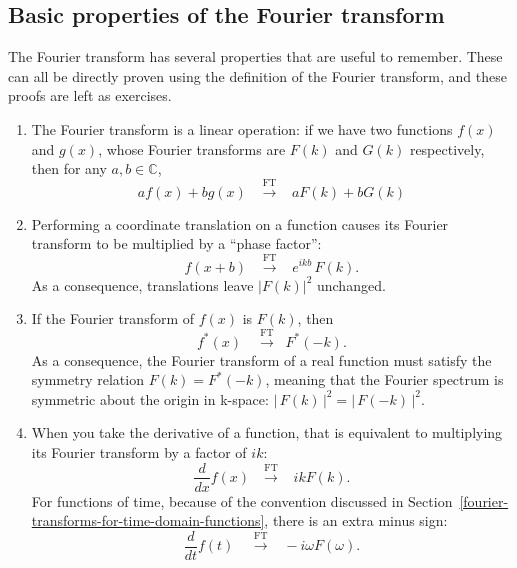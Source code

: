\documentclass[10pt,a4paper]{article}
\begin{document}
\subsection{Basic properties of the Fourier transform}
\label{basic-properties-of-the-fourier-transform}

The Fourier transform has several properties that are useful to
remember. These can all be directly proven using the definition of the
Fourier transform, and these proofs are left as exercises.

\begin{enumerate}
\item 
The Fourier transform is a linear operation: if we have two functions
$f(x)$ and $g(x)$, whose Fourier transforms are $F(k)$ and
$G(k)$ respectively, then for any $a, b \in \mathbb{C}$,
\begin{equation}
  a f(x) + b g(x) \;\;\;  \overset{\mathrm{FT}}{\longrightarrow} \;\;\; a F(k) + b G(k)
\end{equation}

\item
  Performing a coordinate translation on a function causes its Fourier
transform to be multiplied by a ``phase factor'':
\begin{equation}
  f(x+b) \;\;\;  \overset{\mathrm{FT}}{\longrightarrow} \;\;\; e^{ikb} \, F(k).
\end{equation}
As a consequence, translations leave $|F(k)|^2$ unchanged.

\item
If the Fourier transform of $f(x)$ is $F(k)$, then
\begin{equation}
  f^*(x) \quad  \overset{\mathrm{FT}}{\longrightarrow} \;\; F^*(-k).
\end{equation}
As a consequence, the Fourier transform of a real function must satisfy
the symmetry relation $F(k) = F^*(-k)$, meaning that the Fourier
spectrum is symmetric about the origin in k-space:
$\big|\,F(k)\,\big|^2 = \big|\,F(-k)\,\big|^2.$

\item
  When you take the derivative of a function, that is equivalent to
multiplying its Fourier transform by a factor of $ik$:
\begin{equation}
  \frac{d}{dx} f(x) \,\;\;  \overset{\mathrm{FT}}{\longrightarrow} \;\;\;
  ik F(k).
\end{equation}
For functions of time, because of the convention discussed in
Section~\ref{fourier-transforms-for-time-domain-functions}, there is
an extra minus sign:
\begin{equation}
  \frac{d}{dt} f(t) \;\;\;\;  \overset{\mathrm{FT}}{\longrightarrow} \;\;\;
  -i\omega F(\omega).
\end{equation}
\end{enumerate}
\end{document}
